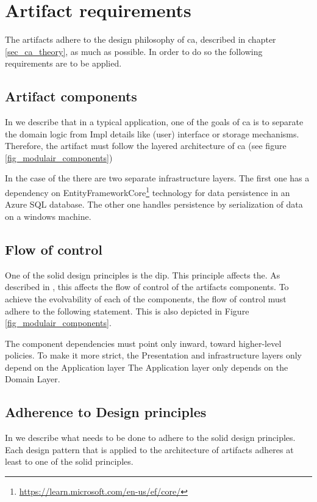 \section{Artifact requirements} \label{sec_artifact_requirements}

The artifacts adhere to the design philosophy of \gls{ca}, described in chapter
\ref{sec_ca_theory}, as much as possible. In order to do so the following
requirements are to be applied.

\subsection{Artifact components}
In  we describe that in a typical application, one of the goals of
\gls{ca} is to separate the domain logic from Impl details like (user) interface
or storage mechanisms. Therefore, the artifact must follow the layered architecture of
\gls{ca} (see figure \ref{fig_modulair_components})

In the case of the  there are two separate infrastructure
layers. The first one has a dependency on
EntityFrameworkCore\footnote{\url{https://learn.microsoft.com/en-us/ef/core/}} technology
for data persistence in an Azure SQL database. The other one handles persistence by
serialization of data on a windows machine.

\subsection{Flow of control}
One of the \gls{solid} design principles is the \acrfull{dip}. This principle affects the.
As described in , this affects the flow of control of the
artifacts components. To achieve the evolvability of each of the components, the flow of
control must adhere to the following statement. This is also depicted in Figure
\ref{fig_modulair_components}.

The component dependencies must point only inward, toward higher-level policies. To make
it more strict, the Presentation and infrastructure layers only depend on the Application
layer The Application layer only depends on the  Domain Layer.

\subsection{Adherence to Design principles}
In  we describe what needs to be done to adhere to the
\gls{solid} design principles. Each design pattern that is applied to the architecture of
artifacts adheres at least to one of the \gls{solid} principles.

